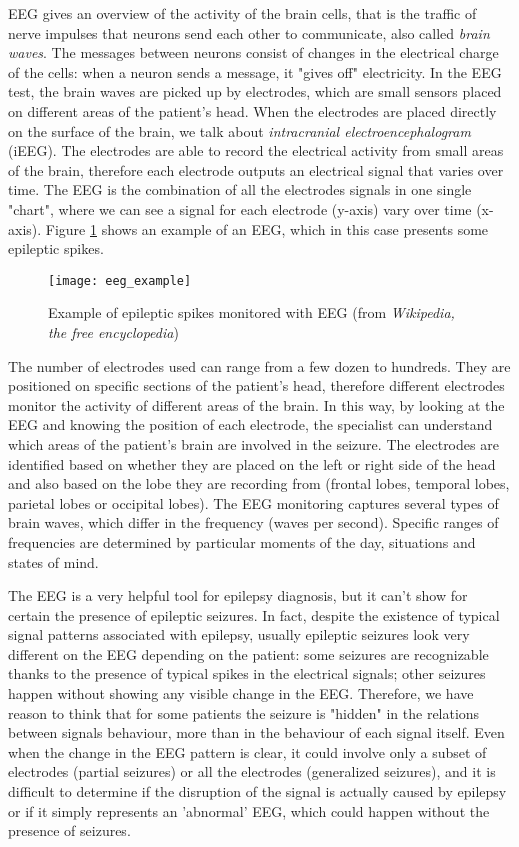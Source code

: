 EEG gives an overview of the activity of the brain cells, that is the traffic of nerve impulses that neurons send each other to communicate, also called \textit{brain waves}. The messages between neurons consist of changes in the electrical charge of the cells: when a neuron sends a message, it "gives off" electricity. In the EEG test, the brain waves are picked up by electrodes, which are small sensors placed on different areas of the patient's head. When the electrodes are placed directly on the surface of the brain, we talk about \textit{intracranial electroencephalogram} (iEEG). The electrodes are able to record the electrical activity from small areas of the brain, therefore each electrode outputs an electrical signal that varies over time. The EEG is the combination of all the electrodes signals in one single "chart", where we can see a signal for each electrode (y-axis) vary over time (x-axis). Figure \ref{fig:eeg_example} shows an example of an EEG, which in this case presents some epileptic spikes.

\begin{figure}[htbp]
    \centering
    \texttt{[image: eeg\_example]}
    \caption{Example of epileptic spikes monitored with EEG (from \textit{Wikipedia, the free encyclopedia})}
    \label{fig:eeg_example}
\end{figure}

The number of electrodes used can range from a few dozen to hundreds. They are positioned on specific sections of the patient's head, therefore different electrodes monitor the activity of different areas of the brain. In this way, by looking at the EEG and knowing the position of each electrode, the specialist can understand which areas of the patient's brain are involved in the seizure. The electrodes are identified based on whether they are placed on the left or right side of the head and also based on the lobe they are recording from (frontal lobes, temporal lobes, parietal lobes or occipital lobes). The EEG monitoring captures several types of brain waves, which differ in the frequency (waves per second). Specific ranges of frequencies are determined by particular moments of the day, situations and states of mind.

The EEG is a very helpful tool for epilepsy diagnosis, but it can't show for certain the presence of epileptic seizures. In fact, despite the existence of typical signal patterns associated with epilepsy, usually epileptic seizures look very different on the EEG depending on the patient: some seizures are recognizable thanks to the presence of typical spikes in the electrical signals; other seizures happen without showing any visible change in the EEG. Therefore, we have reason to think that for some patients the seizure is "hidden" in the relations between signals behaviour, more than in the behaviour of each signal itself. Even when the change in the EEG pattern is clear, it could involve only a subset of electrodes (partial seizures) or all the electrodes (generalized seizures), and it is difficult to determine if the disruption of the signal is actually caused by epilepsy or if it simply represents an 'abnormal' EEG, which could happen without the presence of seizures.

